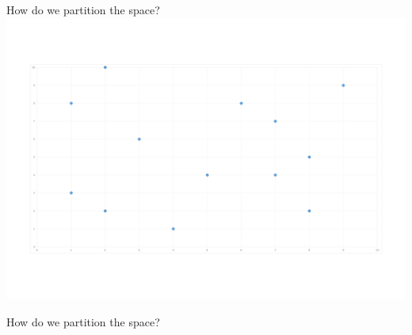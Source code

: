 \documentclass[11 pt]{beamer}
\begin{document}
\begin{frame}{How do we partition the space?}
  \centering
  \includegraphics[width=.7\textwidth]{figures/Base.png}
\end{frame}
\begin{frame}{How do we partition the space?}

\end{frame}
\end{document}
